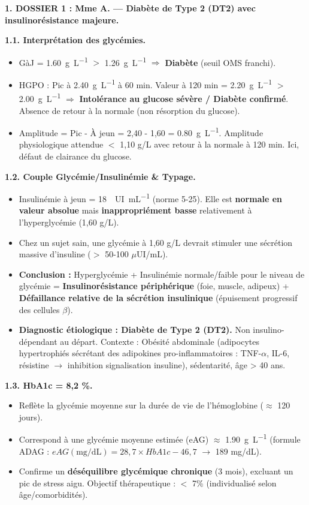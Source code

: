 \documentclass[11pt]{article}
\newcounter{popsec}
\newcounter{popsub}
\newcommand{\courssub}[1]{%
  \stepcounter{popsub}%
  \par\vspace{9pt}\noindent{\popxbold\fontsize{11.5}{13}\selectfont\color{popink}{\color{poporange}\thepopsec.\thepopsub}\hspace{6pt}#1}\par\nopagebreak\vspace{4pt}
}
\begin{document}
\courssub{Démarche et corrigé commenté}
\begin{exoresolu}
\textbf{1. DOSSIER 1 : Mme A. — Diabète de Type 2 (DT2) avec insulinorésistance majeure.}

\textbf{1.1. Interprétation des glycémies.}
\begin{itemize}
    \item GàJ = \SI{1,60}{g.L^{-1}} $>$ \SI{1,26}{g.L^{-1}} $\Rightarrow$ \textbf{Diabète} (seuil OMS franchi).
    \item HGPO : Pic à \SI{2,40}{g.L^{-1}} à 60 min. Valeur à 120 min = \SI{2,20}{g.L^{-1}} $>$ \SI{2,00}{g.L^{-1}} $\Rightarrow$ \textbf{Intolérance au glucose sévère / Diabète confirmé}. Absence de retour à la normale (non résorption du glucose).
    \item Amplitude = Pic - À jeun = 2,40 - 1,60 = \SI{0,80}{g.L^{-1}}. Amplitude physiologique attendue $<$ 1,10 g/L avec retour à la normale à 120 min. Ici, défaut de clairance du glucose.
\end{itemize}

\textbf{1.2. Couple Glycémie/Insulinémie \& Typage.}
\begin{itemize}
    \item Insulinémie à jeun = \SI{18}{\mu UI.mL^{-1}} (norme 5-25). Elle est \textbf{normale en valeur absolue} mais \textbf{inappropriément basse} relativement à l'hyperglycémie (1,60 g/L).
    \item Chez un sujet sain, une glycémie à 1,60 g/L devrait stimuler une sécrétion massive d'insuline ($>$ 50-100 $\mu$UI/mL).
    \item \textbf{Conclusion :} Hyperglycémie + Insulinémie normale/faible pour le niveau de glycémie = \textbf{Insulinorésistance périphérique} (foie, muscle, adipeux) + \textbf{Défaillance relative de la sécrétion insulinique} (épuisement progressif des cellules $\beta$).
    \item \textbf{Diagnostic étiologique : Diabète de Type 2 (DT2).} Non insulino-dépendant au départ. Contexte : Obésité abdominale (adipocytes hypertrophiés sécrétant des adipokines pro-inflammatoires : TNF-$\alpha$, IL-6, résistine $\rightarrow$ inhibition signalisation insuline), sédentarité, âge > 40 ans.
\end{itemize}

\textbf{1.3. HbA1c = 8,2 \%.}
\begin{itemize}
    \item Reflète la glycémie moyenne sur la durée de vie de l'hémoglobine ($\approx$ 120 jours).
    \item Correspond à une glycémie moyenne estimée (eAG) $\approx$ \SI{1,90}{g.L^{-1}} (formule ADAG : $eAG(\text{mg/dL}) = 28,7 \times HbA1c - 46,7$ $\rightarrow$ 189 mg/dL).
    \item Confirme un \textbf{déséquilibre glycémique chronique} (3 mois), excluant un pic de stress aigu. Objectif thérapeutique : $<$ 7\% (individualisé selon âge/comorbidités).
\end{itemize}


\end{exoresolu}
\end{document}
